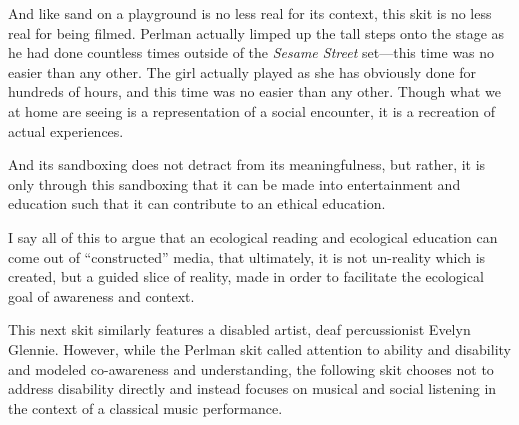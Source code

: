 \documentclass[12pt,letterpaper]{article}
\begin{document}
	And like sand on a playground is no less real for its context,
	this skit is no less real for being filmed. Perlman actually 
	limped up the tall steps onto the stage as he had done countless times 
	outside of the \textit{Sesame Street} set---this time was no easier than
	any other. The girl actually played as she has obviously done for
	hundreds of hours, and this time was no easier than any other. 
	Though what we at home are seeing is a representation of a social 
	encounter, it is a recreation of actual	experiences. 

	And its sandboxing does not detract from its meaningfulness, but rather,
	it is only through this sandboxing that it can be made into 
	entertainment and
	education such that it can contribute to an ethical education. 
	
	I say all of this to argue that an ecological reading and ecological 
	education 
	can come out of ``constructed'' media, that ultimately, it is not 
	un-reality which is created, but a guided slice of reality, made in 
	order to facilitate the ecological goal of awareness and context.  
	
	This next skit similarly features a disabled artist, deaf percussionist 
	Evelyn Glennie. However, while the Perlman skit called attention to
	ability and disability and modeled co-awareness and understanding, the
	following skit chooses not to address disability directly and instead 
	focuses on musical and social listening in the context of a classical 
	music performance. 
	
\end{document}

